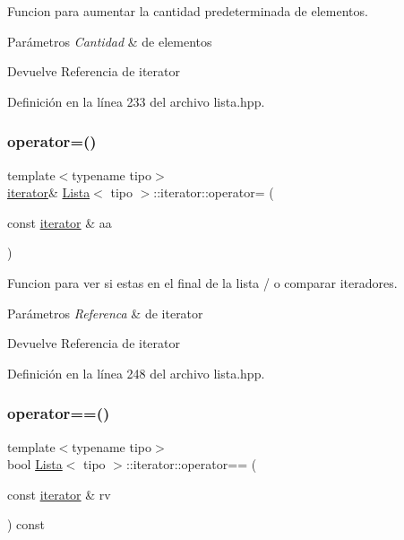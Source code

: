 Funcion para aumentar la cantidad predeterminada de elementos. 


\begin{DoxyParams}{Parámetros}
{\em Cantidad} & de elementos \\
\hline
\end{DoxyParams}
\begin{DoxyReturn}{Devuelve}
Referencia de iterator 
\end{DoxyReturn}


Definición en la línea 233 del archivo lista.\+hpp.

\mbox{\label{classLista_1_1iterator_a602f51e54500d6027158a48a8495826a}} 
\subsubsection{\texorpdfstring{operator=()}{operator=()}}
{\footnotesize\ttfamily template$<$typename tipo$>$ \\
\hyperlink{classLista_1_1iterator}{iterator}\& \hyperlink{classLista}{Lista}$<$ tipo $>$\+::iterator\+::operator= (\begin{DoxyParamCaption}\item[{const \hyperlink{classLista_1_1iterator}{iterator} \&}]{aa }\end{DoxyParamCaption})\hspace{0.3cm}{\ttfamily [inline]}}



Funcion para ver si estas en el final de la lista / o comparar iteradores. 


\begin{DoxyParams}{Parámetros}
{\em Referenca} & de iterator \\
\hline
\end{DoxyParams}
\begin{DoxyReturn}{Devuelve}
Referencia de iterator 
\end{DoxyReturn}


Definición en la línea 248 del archivo lista.\+hpp.

\mbox{\label{classLista_1_1iterator_abb50011145596234ea6ac6d1bd5fe920}} 
\subsubsection{\texorpdfstring{operator==()}{operator==()}}
{\footnotesize\ttfamily template$<$typename tipo$>$ \\
bool \hyperlink{classLista}{Lista}$<$ tipo $>$\+::iterator\+::operator== (\begin{DoxyParamCaption}\item[{const \hyperlink{classLista_1_1iterator}{iterator} \&}]{rv }\end{DoxyParamCaption}) const\hspace{0.3cm}{\ttfamily [inline]}}



